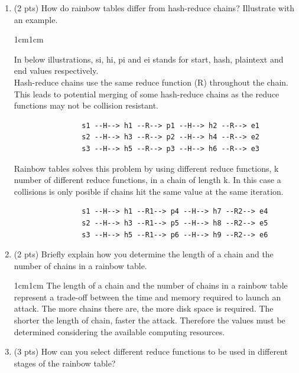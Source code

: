\documentclass[11pt,letterpaper]{article}
\newenvironment{answer}{\em \color{blue} \begin{adjustwidth}{1cm}{1cm}}{\end{adjustwidth}}
\begin{document}
	\begin{enumerate}
		
		\item (2 pts) How do rainbow tables differ from hash-reduce chains? Illustrate with an example.
		
		\begin{answer}
			
			In below illustrations, si, hi, pi and ei stands for start, hash, plaintext and end values respectively.\\
			
			Hash-reduce chains use the same reduce function (R) throughout the chain. This leads to potential merging of some hash-reduce chains as the reduce functions may not be collision resistant. 
			
			\begin{verbatim}
				s1 --H--> h1 --R--> p1 --H--> h2 --R--> e1
				s2 --H--> h3 --R--> p2 --H--> h4 --R--> e2
				s3 --H--> h5 --R--> p3 --H--> h6 --R--> e3				
			\end{verbatim}
			
			Rainbow tables solves this problem by using different reduce functions, k number of different reduce functions, in a chain of length k. In this case a collisions is only posible if chains hit the same value at the same iteration.  
			
			\begin{verbatim}
				s1 --H--> h1 --R1--> p4 --H--> h7 --R2--> e4
				s2 --H--> h3 --R1--> p5 --H--> h8 --R2--> e5
				s3 --H--> h5 --R1--> p6 --H--> h9 --R2--> e6								
			\end{verbatim}
			
		\end{answer}
		
		\item (2 pts) Briefly explain how you determine the length of a chain and the number of chains in a rainbow table. 
		
		\begin{answer}
		The length of a chain and the number of chains in a rainbow table represent a trade-off between the time and memory required to launch an attack. The more chains there are, the more disk space is required. The shorter the length of chain, faster the attack.	Therefore the values must be determined considering the available computing resources.
		\end{answer}
		
		\item (3 pts) How can you select different reduce functions to be used in different stages of the rainbow table?
		

\end{enumerate}
\end{document}
